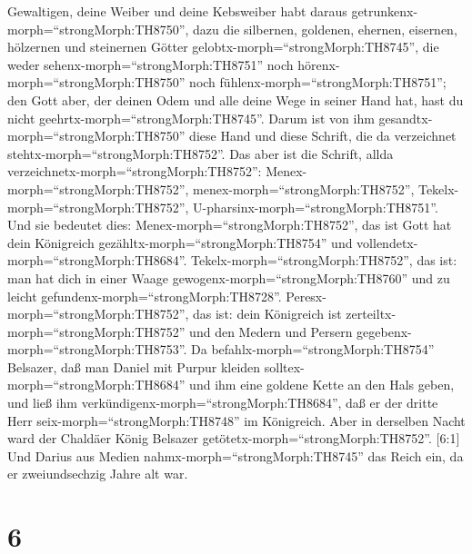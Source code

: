 Gewaltigen, deine Weiber und deine Kebsweiber habt daraus
getrunkenx-morph=``strongMorph:TH8750'', dazu die silbernen, goldenen,
ehernen, eisernen, hölzernen und steinernen Götter
gelobtx-morph=``strongMorph:TH8745'', die weder
sehenx-morph=``strongMorph:TH8751'' noch
hörenx-morph=``strongMorph:TH8750'' noch
fühlenx-morph=``strongMorph:TH8751''; den Gott aber, der deinen Odem und
alle deine Wege in seiner Hand hat, hast du nicht
geehrtx-morph=``strongMorph:TH8745''.  Darum ist von ihm
gesandtx-morph=``strongMorph:TH8750'' diese Hand und diese Schrift, die
da verzeichnet stehtx-morph=``strongMorph:TH8752''.  Das
aber ist die Schrift, allda verzeichnetx-morph=``strongMorph:TH8752'':
Menex-morph=``strongMorph:TH8752'', menex-morph=``strongMorph:TH8752'',
Tekelx-morph=``strongMorph:TH8752'',
U-pharsinx-morph=``strongMorph:TH8751''.  Und sie bedeutet
dies: Menex-morph=``strongMorph:TH8752'', das ist Gott hat dein
Königreich gezähltx-morph=``strongMorph:TH8754'' und
vollendetx-morph=``strongMorph:TH8684''. 
Tekelx-morph=``strongMorph:TH8752'', das ist: man hat dich in einer
Waage gewogenx-morph=``strongMorph:TH8760'' und zu leicht
gefundenx-morph=``strongMorph:TH8728''. 
Peresx-morph=``strongMorph:TH8752'', das ist: dein Königreich ist
zerteiltx-morph=``strongMorph:TH8752'' und den Medern und Persern
gegebenx-morph=``strongMorph:TH8753''.  Da
befahlx-morph=``strongMorph:TH8754'' Belsazer, daß man Daniel mit Purpur
kleiden solltex-morph=``strongMorph:TH8684'' und ihm eine goldene Kette
an den Hals geben, und ließ ihm
verkündigenx-morph=``strongMorph:TH8684'', daß er der dritte Herr
seix-morph=``strongMorph:TH8748'' im Königreich.  Aber in
derselben Nacht ward der Chaldäer König Belsazer
getötetx-morph=``strongMorph:TH8752''.  {[}6:1{]} Und
Darius aus Medien nahmx-morph=``strongMorph:TH8745'' das Reich ein, da
er zweiundsechzig Jahre alt war.

\hypertarget{section-5}{%
\section{6}\label{section-5}}


